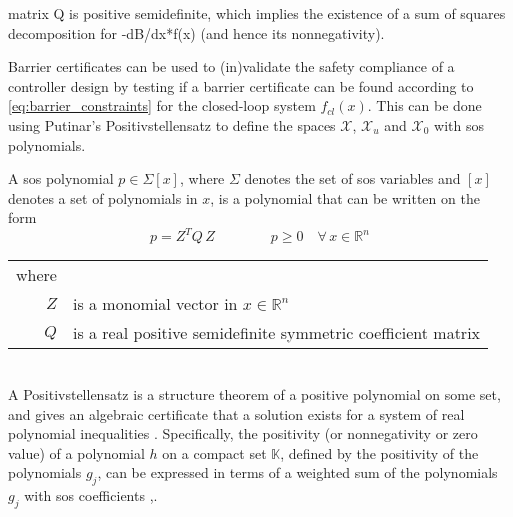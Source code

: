 matrix Q is positive semidefinite, which implies the existence
of a sum of squares decomposition for -dB/dx*f(x) (and
hence its nonnegativity).

Barrier certificates can be used to (in)validate the safety compliance of a controller design by testing if a barrier certificate can be found according to \autoref{eq:barrier_constraints} for the closed-loop system $f_{cl}(x)$. This can be done using Putinar's Positivstellensatz to define the spaces $\mathcal{X}$, $\mathcal{X}_u$ and $\mathcal{X}_0$ with \gls{sos} polynomials. 

A \gls{sos} polynomial $p\in \Sigma[x]$, where $\Sigma$ denotes the set of \gls{sos} variables and $[x]$ denotes a set of polynomials in $x$, is a polynomial that can be written on the form \citep{bib:sostools}
\begin{equation}
p = Z^T Q \, Z \qquad\qquad p\geq 0 \quad \forall \, x\in\mathbb{R}^n %
\label{eq:sos_polynomial}
\end{equation}
\begin{tabular}{rl}
where &\\
$Z$ & is a monomial vector in $x\in \mathbb{R}^n$\\
$Q$ & is a real positive semidefinite symmetric coefficient matrix\\
\end{tabular}\\

A Positivstellensatz is a structure theorem of a positive polynomial on some set, and gives an algebraic certificate that a solution exists for a system of real polynomial inequalities \citep{bib:positivstellensatz}. 
Specifically, the positivity (or nonnegativity or zero value) of a polynomial $h$ on a compact set $\mathbb{K}$, defined by the positivity of the polynomials $g_j$, can be expressed in terms of a weighted sum of the polynomials $g_j$ with \gls{sos} coefficients \citep[pp 184-186]{bib:sos_putinar_laurent},\citep[pp 28-29]{bib:sos_putinar_lasserre}.\\

